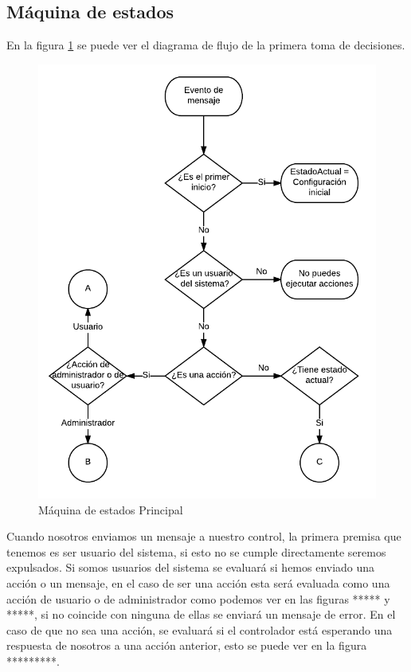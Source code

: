 \documentclass[10pt,journal,compsoc]{IEEEtran}
\begin{document}
\subsection{Máquina de estados}
En la figura \ref{fig:MaqEst} se puede ver el diagrama de flujo de la primera toma de decisiones. 
\begin{figure}[h]
\centering
\includegraphics[scale=0.5]{MaqEstPrin}
\caption{Máquina de estados Principal}
\label{fig:MaqEst}
\end{figure}

Cuando nosotros enviamos un mensaje a nuestro control, la primera premisa que tenemos es ser usuario del sistema, si esto no se cumple directamente seremos expulsados.
Si somos usuarios del sistema se evaluará si hemos enviado una acción o un mensaje, en el caso de ser una acción esta será evaluada como una acción de usuario o de administrador como podemos ver en las figuras ***** y *****, si no coincide con ninguna de ellas se enviará un mensaje de error.
En el caso de que no sea una acción, se evaluará si el controlador está esperando una respuesta de nosotros a una acción anterior, esto se puede ver en la figura *********.
\end{document}
